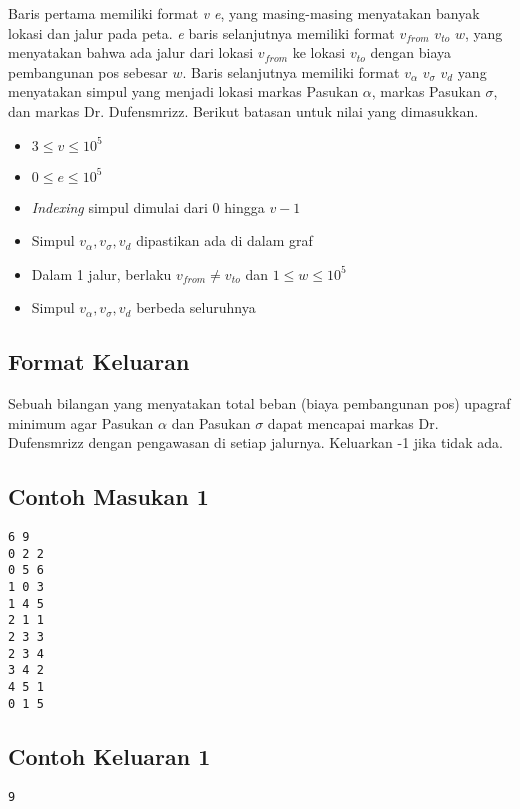 \documentclass{article}
\begin{document}
Baris pertama memiliki format \textit{v} \textit{e}, yang masing-masing menyatakan banyak lokasi dan jalur pada peta. \textit{e} baris selanjutnya memiliki format \(v_{from}\) \(v_{to}\) \(w\), yang menyatakan bahwa ada jalur dari lokasi \(v_{from}\) ke lokasi \(v_{to}\) dengan biaya pembangunan pos sebesar \(w\). Baris selanjutnya memiliki format \(v_{\alpha}\) \(v_{\sigma}\) \(v_{d}\) yang menyatakan simpul yang menjadi lokasi markas Pasukan \(\alpha\), markas Pasukan \(\sigma\), dan markas Dr. Dufensmrizz.\newline
Berikut batasan untuk nilai yang dimasukkan.
\begin{itemize}
    \item \(3 \leq v \leq 10^5\)
    \item \(0 \leq e \leq 10^5\)
    \item \textit{Indexing} simpul dimulai dari 0 hingga \(v - 1\)
    \item Simpul \(v_{\alpha}, v_{\sigma}, v_d\) dipastikan ada di dalam graf
    \item Dalam 1 jalur, berlaku \(v_{from} \neq v_{to}\) dan \(1 \leq w \leq 10^5\)
    \item Simpul \(v_{\alpha}, v_{\sigma}, v_d\) berbeda seluruhnya
\end{itemize}

\subsection*{Format Keluaran}

Sebuah bilangan yang menyatakan total beban (biaya pembangunan pos) upagraf minimum agar Pasukan \(\alpha\) dan Pasukan \(\sigma\) dapat mencapai markas Dr. Dufensmrizz dengan pengawasan di setiap jalurnya. Keluarkan -1 jika tidak ada.

\begin{multicols}{2}
\subsection*{Contoh Masukan 1}
\begin{lstlisting}
6 9
0 2 2
0 5 6
1 0 3
1 4 5
2 1 1
2 3 3
2 3 4
3 4 2
4 5 1
0 1 5
\end{lstlisting}
\columnbreak
\subsection*{Contoh Keluaran 1}
\begin{lstlisting}
9
\end{lstlisting}
\vfill
\null
\end{multicols}
\end{document}
